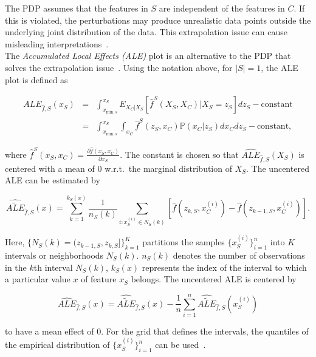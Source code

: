 \documentclass[runningheads]{llncs}
\begin{document}
The PDP assumes that the features in $S$ are independent of the features in
$C$. If this is violated, the perturbations may produce unrealistic data points
outside the underlying joint distribution of the data. This extrapolation issue
can cause misleading
interpretations~\cite{molnar_interpretable_2022,molnar_general_2022}.\\

\noindent The \textit{Accumulated Local Effects (ALE)} plot is an alternative to the PDP that
solves the extrapolation issue~\cite{apley_visualizing_2020}. Using the notation above,
for $|S|=1$, the ALE plot is defined as

\begin{eqnarray}
    ALE_{\hat f,S}(x_S) &=& \int_{x_{\text{min},s}}^{x_S} E_{X_C|X_S}
    \left[\hat{f}^S(X_S, X_C)|X_S = z_S\right] dz_S - \text{constant} \\
    &=& \int_{x_{\text{min},s}}^{x_S} \int_{x_C}
    \hat{f}^S(z_S, x_C)\mathbb{P}(x_C|z_S)dx_{C}dz_{S} - \text{constant},
\end{eqnarray}

\noindent where $\hat{f}^S(x_S, x_C) = \frac{\partial \hat{f}(x_S, x_C)}{\partial x_S}$.
The constant is chosen so that $\widehat{ALE}_{\hat f,S}(X_S)$ is centered with a mean of $0$
w.r.t.\ the marginal distribution of $X_S$. The uncentered ALE can be estimated by

\begin{equation}\label{eq:ale-estimate-uncentered}
    \widehat{\widetilde{ALE}}_{\hat f, S}(x) =
    \sum_{k=1}^{k_S(x)} \frac{1}{n_S(k)} \sum_{i:x_S^{(i)} \in N_S(k)}
    \left[\hat f(z_{k,S}, x_{C}^{(i)}) - \hat f(z_{k-1,S}, x_{C}^{(i)})\right].
\end{equation}

\noindent Here, $\{N_S(k) = (z_{k-1,S}, z_{k,S}]\}_{k=1}^{K}$ partitions the samples
$\{x^{(i)}_S\}_{i=1}^n$ into $K$ intervals or neighborhoods $N_S(k)$. $n_S(k)$ denotes
the number of observations in the $k$th interval $N_S(k)$, $k_S(x)$ represents the index
of the interval to which a particular value $x$ of feature $x_S$ belongs.
The uncentered ALE is centered by

\begin{equation}\label{eq:ale-estimate-centered}
    \widehat{ALE}_{\hat f, S}(x) =
    \widehat{\widetilde{ALE}}_{\hat f, S}(x)
    - \frac{1}{n} \sum_{i=1}^n \widehat{\widetilde{ALE}}_{\hat f, S}(x_S^{(i)})
\end{equation}

\noindent to have a mean effect of $0$. For the grid that defines the intervals,
the quantiles of the empirical distribution of $\{x^{(i)}_S\}_{i=1}^n$ can be
used~\cite{apley_visualizing_2020}.\\
\end{document}
